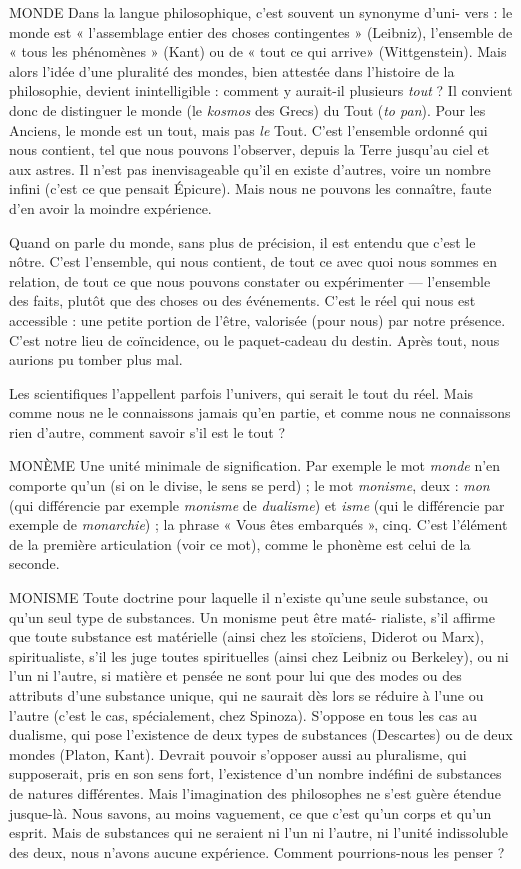 MONDE Dans la langue philosophique, c’est souvent un synonyme d’uni-
vers : le monde est « l’assemblage entier des choses contingentes »
(Leibniz), l’ensemble de « tous les phénomènes » (Kant) ou de « tout ce qui
arrive» (Wittgenstein). Mais alors l’idée d’une pluralité des mondes, bien
attestée dans l’histoire de la philosophie, devient inintelligible : comment y
aurait-il plusieurs {\it tout} ? Il convient donc de distinguer le monde (le {\it kosmos} des
Grecs) du Tout ({\it to pan}). Pour les Anciens, le monde est un tout, mais pas {\it le}
Tout. C’est l’ensemble ordonné qui nous contient, tel que nous pouvons
l’observer, depuis la Terre jusqu’au ciel et aux astres. Il n’est pas inenvisageable
qu’il en existe d’autres, voire un nombre infini (c’est ce que pensait Épicure).
Mais nous ne pouvons les connaître, faute d’en avoir la moindre expérience.

Quand on parle du monde, sans plus de précision, il est entendu que c’est
le nôtre. C’est l’ensemble, qui nous contient, de tout ce avec quoi nous sommes
en relation, de tout ce que nous pouvons constater ou expérimenter —
l’ensemble des faits, plutôt que des choses ou des événements. C’est le réel qui
nous est accessible : une petite portion de l’être, valorisée (pour nous) par notre
présence. C’est notre lieu de coïncidence, ou le paquet-cadeau du destin. Après
tout, nous aurions pu tomber plus mal.

Les scientifiques l’appellent parfois l’univers, qui serait le tout du réel. Mais
comme nous ne le connaissons jamais qu’en partie, et comme nous ne connaissons
rien d’autre, comment savoir s’il est le tout ?

MONÈME Une unité minimale de signification. Par exemple le mot {\it monde}
n’en comporte qu’un (si on le divise, le sens se perd) ; le mot
{\it monisme}, deux : {\it mon} (qui différencie par exemple {\it monisme} de {\it dualisme}) et {\it isme}
(qui le différencie par exemple de {\it monarchie}) ; la phrase « Vous êtes embarqués »,
cinq. C’est l'élément de la première articulation (voir ce mot), comme
le phonème est celui de la seconde.

MONISME Toute doctrine pour laquelle il n’existe qu’une seule substance,
ou qu’un seul type de substances. Un monisme peut être maté-
rialiste, s’il affirme que toute substance est matérielle (ainsi chez les stoïciens,
Diderot ou Marx), spiritualiste, s’il les juge toutes spirituelles (ainsi chez Leibniz
ou Berkeley), ou ni l’un ni l’autre, si matière et pensée ne sont pour lui que
des modes ou des attributs d’une substance unique, qui ne saurait dès lors se
réduire à l’une ou l’autre (c’est le cas, spécialement, chez Spinoza). S'oppose en
tous les cas au dualisme, qui pose l’existence de deux types de substances (Descartes)
ou de deux mondes (Platon, Kant). Devrait pouvoir s’opposer aussi au
pluralisme, qui supposerait, pris en son sens fort, l’existence d’un nombre indéfini
de substances de natures différentes. Mais l'imagination des philosophes ne
s’est guère étendue jusque-là. Nous savons, au moins vaguement, ce que c’est
qu'un corps et qu’un esprit. Mais de substances qui ne seraient ni l’un ni
l’autre, ni l'unité indissoluble des deux, nous n’avons aucune expérience. Comment
pourrions-nous les penser ?

